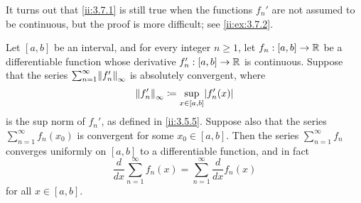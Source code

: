 \begin{rmk}\label{ii:3.7.2}
  It turns out that \cref{ii:3.7.1} is still true when the functions \(f_n'\) are not assumed to be continuous, but the proof is more difficult;
  see \cref{ii:ex:3.7.2}.
\end{rmk}

\begin{cor}\label{ii:3.7.3}
  Let \([a, b]\) be an interval, and for every integer \(n \geq 1\), let \(f_n : [a, b] \to \mathbb{R}\) be a differentiable function whose derivative \(f_n' : [a, b] \to \mathbb{R}\) is continuous.
  Suppose that the series \(\sum_{n = 1}^\infty \norm*{f_n'}_\infty\) is absolutely convergent, where
  \[
    \norm*{f_n'}_\infty \coloneqq \sup_{x \in [a, b]} \abs{f_n'(x)}
  \]
  is the sup norm of \(f_n'\), as defined in \cref{ii:3.5.5}.
  Suppose also that the series \(\sum_{n = 1}^\infty f_n(x_0)\) is convergent for some \(x_0 \in [a, b]\).
  Then the series \(\sum_{n = 1}^\infty f_n\) converges uniformly on \([a, b]\) to a differentiable function, and in fact
  \[
    \dfrac{d}{dx} \sum_{n = 1}^\infty f_n(x) = \sum_{n = 1}^\infty \dfrac{d}{dx} f_n(x)
  \]
  for all \(x \in [a, b]\).
\end{cor}

